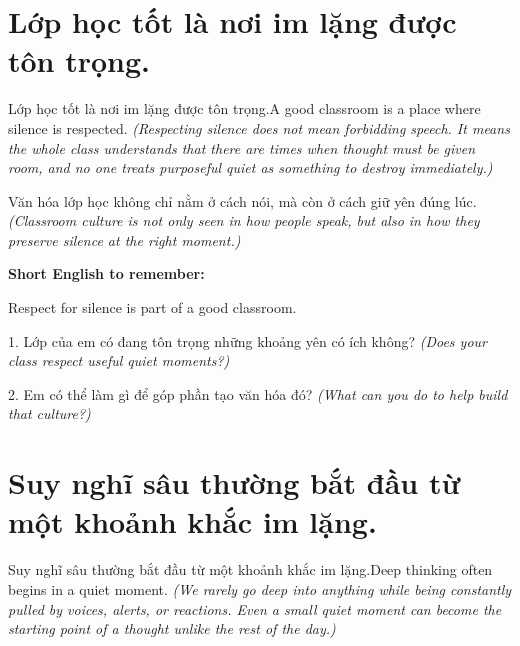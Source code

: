 \section{Lớp học tốt là nơi im lặng được tôn trọng.}
\begin{truyen}{Lớp học tốt là nơi im lặng được tôn trọng.}{A good classroom is a place where silence is respected.}
\textit{(Respecting silence does not mean forbidding speech. It means the whole class understands that there are times when thought must be given room, and no one treats purposeful quiet as something to destroy immediately.)}
\end{truyen}

\begin{baihoc}
Văn hóa lớp học không chỉ nằm ở cách nói, mà còn ở cách giữ yên đúng lúc.
\textit{(Classroom culture is not only seen in how people speak, but also in how they preserve silence at the right moment.)}
\end{baihoc}

\begin{ghinhoanh}
\textbf{Short English to remember:}

Respect for silence is part of a good classroom.

\end{ghinhoanh}

\begin{tuhocnhanh}
1. Lớp của em có đang tôn trọng những khoảng yên có ích không? \textit{(Does your class respect useful quiet moments?)}

2. Em có thể làm gì để góp phần tạo văn hóa đó? \textit{(What can you do to help build that culture?)}
\end{tuhocnhanh}
\ngancach


\section{Suy nghĩ sâu thường bắt đầu từ một khoảnh khắc im lặng.}
\begin{truyen}{Suy nghĩ sâu thường bắt đầu từ một khoảnh khắc im lặng.}{Deep thinking often begins in a quiet moment.}
\textit{(We rarely go deep into anything while being constantly pulled by voices, alerts, or reactions. Even a small quiet moment can become the starting point of a thought unlike the rest of the day.)}
\end{truyen}


